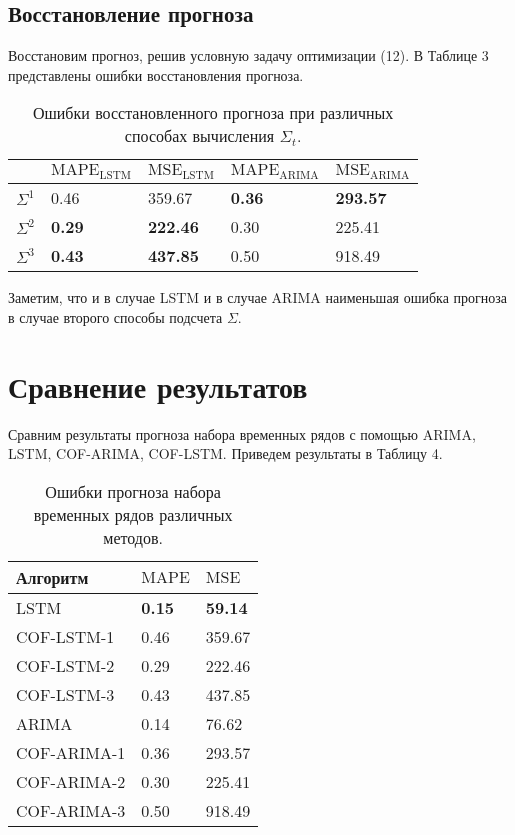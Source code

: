 \documentclass{article}
\begin{document}
\subsection{Восстановление прогноза}

Восстановим прогноз, решив условную задачу оптимизации (12). В Таблице 3 представлены ошибки восстановления прогноза. 

\begin{table}[h]
\centering
\begin{tabular}{|l|l|l|l|l|}
\hline  
         & $\text{MAPE}_{\text{LSTM}}$  & $\text{MSE}_{\text{LSTM}}$  & $\text{MAPE}_{\text{ARIMA}}$ & $\text{MSE}_{\text{ARIMA}}$\\ \hline
${\Sigma}^1$ & 0.46 & 359.67 & \textbf{0.36} & \textbf{293.57} \\ \hline
${\Sigma}^2$ & \textbf{0.29} & \textbf{222.46} & 0.30 & 225.41 \\ \hline
${\Sigma}^3$ & \textbf{0.43} & \textbf{437.85} & 0.50 & 918.49 \\ \hline
\end{tabular}
\caption{Ошибки восстановленного прогноза при различных способах вычисления $\Sigma_t$.}
\label{tab:stat}
\end{table}

Заметим, что и в случае LSTM и в случае ARIMA наименьшая ошибка прогноза в случае второго способы подсчета $\Sigma$. 

\section{Сравнение результатов}

Сравним результаты прогноза набора временных рядов с помощью ARIMA, LSTM, COF-ARIMA, COF-LSTM. Приведем результаты в Таблицу 4. 

\newpage

\begin{table}[h]
\centering
\begin{tabular}{|l|l|l|}
\hline  
  Алгоритм & $\text{MAPE}$  & $\text{MSE}$ \\ \hline
LSTM & \textbf{0.15} & \textbf{59.14} \\ \hline
COF-LSTM-1 & 0.46 & 359.67\\ \hline
COF-LSTM-2 & 0.29 & 222.46 \\ \hline
COF-LSTM-3 & 0.43 & 437.85 \\ \hline
ARIMA &  0.14 & 76.62 \\ \hline
COF-ARIMA-1 & 0.36 & 293.57 \\ \hline
COF-ARIMA-2 & 0.30 & 225.41\\ \hline
COF-ARIMA-3 & 0.50 & 918.49 \\ \hline
\end{tabular}
\caption{Ошибки прогноза набора временных рядов различных методов.}
\label{tab:stat}
\end{table}
\end{document}
